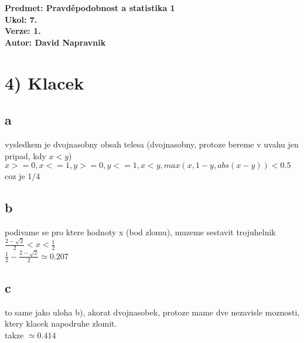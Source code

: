 \documentclass[a4paper]{article}
\begin{document}
\noindent
\textbf{Predmet: Pravděpodobnost a statistika 1}\\
\textbf{Ukol: 7.}\\
\textbf{Verze: 1.}\\
\textbf{Autor: David Napravnik}

\section*{4) Klacek}

\subsection*{a}

vysledkem je dvojnasobny obsah telesa (dvojnasobny, protoze bereme v uvahu jen pripad, kdy $x<y$)\\
$x>=0, x<=1, y>=0, y<=1, x<y, max(x,1-y,abs(x-y))<0.5$\\
coz je $1/4$


\subsection*{b}
podivame se pro ktere hodnoty x (bod zlomu), muzeme sestavit trojuhelnik\\
$\frac{2-\sqrt{2}}{2}<x<\frac{1}{2}$\\
$\frac{1}{2}-\frac{2-\sqrt{2}}{2} \simeq 0.207$


\subsection*{c}
to same jako uloha b), akorat dvojnasobek, protoze
mame dve nezavisle moznosti, ktery klacek napodruhe zlomit.\\
takze $\simeq 0.414$
\end{document}
